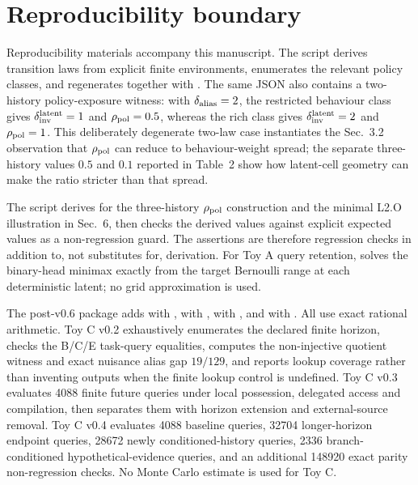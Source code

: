\documentclass[10pt]{article}
\begin{document}
\section{Reproducibility boundary}

Reproducibility materials accompany this manuscript. The script  derives transition laws from explicit finite environments, enumerates the relevant policy classes, and regenerates  together with . The same JSON also contains a two-history policy-exposure witness: with $\delta_{\rm alias}=2$, the restricted behaviour class gives $\delta_{\rm inv}^{\rm latent}=1$ and $\rho_{\rm pol}=0.5$, whereas the rich class gives $\delta_{\rm inv}^{\rm latent}=2$ and $\rho_{\rm pol}=1$. This deliberately degenerate two-law case instantiates the Sec.~3.2 observation that $\rho_{\rm pol}$ can reduce to behaviour-weight spread; the separate three-history values $0.5$ and $0.1$ reported in Table~2 show how latent-cell geometry can make the ratio stricter than that spread.

The script  derives  for the three-history $\rho_{\rm pol}$ construction and the minimal L2.O illustration in Sec.~6, then checks the derived values against explicit expected values as a non-regression guard. The assertions are therefore regression checks in addition to, not substitutes for, derivation. For Toy A query retention,  solves the binary-head minimax exactly from the target Bernoulli range at each deterministic latent; no grid approximation is used.

The post-v0.6 package adds  with ,  with ,  with , and  with . All use exact rational arithmetic. Toy C v0.2 exhaustively enumerates the declared finite horizon, checks the B/C/E task-query equalities, computes the non-injective quotient witness and exact nuisance alias gap $19/129$, and reports lookup coverage rather than inventing outputs when the finite lookup control is undefined. Toy C v0.3 evaluates 4088 finite future queries under local possession, delegated access and compilation, then separates them with horizon extension and external-source removal. Toy C v0.4 evaluates 4088 baseline queries, 32704 longer-horizon endpoint queries, 28672 newly conditioned-history queries, 2336 branch-conditioned hypothetical-evidence queries, and an additional 148920 exact parity non-regression checks. No Monte Carlo estimate is used for Toy C.
\end{document}
